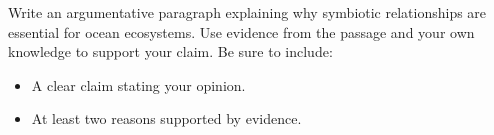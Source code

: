 \documentclass[12pt]{article}
\begin{document}
\begin{tcolorbox}[colframe=black!50, colback=white, title=Question 10: Writing Performance Task]
Write an argumentative paragraph explaining why symbiotic relationships are essential for ocean ecosystems. Use evidence from the passage and your own knowledge to support your claim. Be sure to include:  
\begin{itemize}
    \item A clear claim stating your opinion.  
    \item At least two reasons supported by evidence.   
\end{itemize}

\vspace{2em}
\\[0.8cm] \underline{\hspace{15.8cm}}  
    \\[0.8cm] \underline{\hspace{15.8cm}}  
    \\[0.8cm] \underline{\hspace{15.8cm}}  
    \\[0.8cm] \underline{\hspace{15.8cm}}  
    \\[0.8cm] \underline{\hspace{15.8cm}}  
     \\[0.8cm] \underline{\hspace{15.8cm}}  
\end{tcolorbox}
\end{document}
